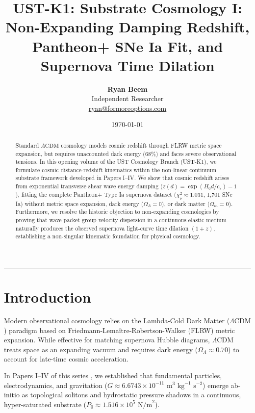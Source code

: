\documentclass[11pt,a4paper]{article}
\title{\Large\bfseries UST-K1: Substrate Cosmology I: Non-Expanding Damping Redshift, Pantheon+ SNe Ia Fit, and Supernova Time Dilation}
\author{
	\textbf{Ryan Beem}\\[0.5em]
	\small Independent Researcher \\
	\small \href{mailto:ryan@formoreoptions.com}{ryan@formoreoptions.com}
}
\date{\today}
\begin{document}
	
	\maketitle
	
	\begin{abstract}
		Standard $\Lambda\text{CDM}$ cosmology models cosmic redshift through FLRW metric space expansion, but requires unaccounted dark energy ($68\%$) and faces severe observational tensions. In this opening volume of the UST Cosmology Branch (UST-K1), we formulate cosmic distance-redshift kinematics within the non-linear continuum substrate framework developed in Papers I--IV. We show that cosmic redshift arises from exponential transverse shear wave energy damping ($z(d) = \exp(H_0 d / c_s) - 1$), fitting the complete Pantheon+ Type Ia supernova dataset ($\chi^2_\nu \approx 1.031$, 1,701 SNe Ia) without metric space expansion, dark energy ($\Omega_\Lambda = 0$), or dark matter ($\Omega_m = 0$). Furthermore, we resolve the historic objection to non-expanding cosmologies by proving that wave packet group velocity dispersion in a continuous elastic medium naturally produces the observed supernova light-curve time dilation $(1+z)$, establishing a non-singular kinematic foundation for physical cosmology.
	\end{abstract}
	
	\vspace{1em}
	\hrule
	\vspace{1.5em}
	
	\section{Introduction}
	\label{sec:intro}
	
	Modern observational cosmology relies on the Lambda-Cold Dark Matter ($\Lambda\text{CDM}$) paradigm based on Friedmann-Lemaître-Robertson-Walker (FLRW) metric expansion. While effective for matching supernova Hubble diagrams, $\Lambda\text{CDM}$ treats space as an expanding vacuum and requires dark energy ($\Omega_\Lambda \approx 0.70$) to account for late-time cosmic acceleration.
	
	In Papers I--IV of this series \cite{PaperI, PaperII, PaperIII, PaperIV}, we established that fundamental particles, electrodynamics, and gravitation ($G \approx 6.6743 \times 10^{-11} \text{ m}^3\text{ kg}^{-1}\text{ s}^{-2}$) emerge ab-initio as topological solitons and hydrostatic pressure shadows in a continuous, hyper-saturated substrate ($P_0 \approx 1.516 \times 10^5 \text{ N/m}^2$).
	
\end{document}
